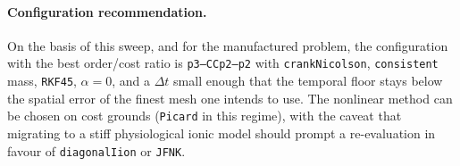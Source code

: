 \documentclass[11pt,a4paper]{article}
\newcommand{\code}[1]{\texttt{\small #1}}
\begin{document}
\paragraph{Configuration recommendation.}
On the basis of this sweep, and for the manufactured problem, the configuration
with the best order/cost ratio is \code{p3--CCp2--p2} with
\code{crankNicolson}, \code{consistent} mass, \code{RKF45}, $\alpha=0$, and a
$\Delta t$ small enough that the temporal floor stays below the spatial error of
the finest mesh one intends to use. The nonlinear method can be chosen on cost
grounds (\code{Picard} in this regime), with the caveat that migrating to a stiff
physiological ionic model should prompt a re-evaluation in favour of
\code{diagonalIion} or \code{JFNK}.
\end{document}
